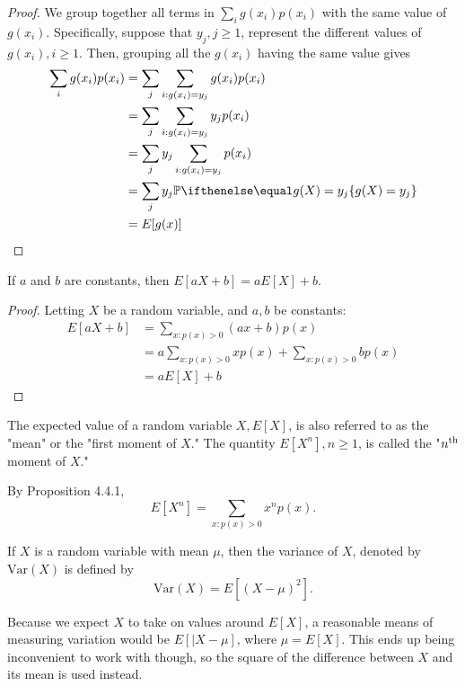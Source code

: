 \documentclass[a4paper,11pt]{article}
\begin{document}
\begin{outline}
    \begin{proof}
      We group together all terms in \(\sum_i g(x_i)p(x_i)\) with the same value of \(g(x_i)\). Specifically, 
      suppose that \(y_j, j\geq 1\), represent the different values of \(g(x_i), i\geq 1\). Then, grouping 
      all the \(g(x_i)\) having the same value gives
      \begin{align*}
        \sum_ig(x_i)p(x_i) &= \sum_j\sum_{i: g(x_i)=y_j} g(x_i)p(x_i) \\
                           &= \sum_j\sum_{i:g(x_i)=y_j} y_jp(x_i) \\
                           &= \sum_jy_j\sum_{i:g(x_i)=y_j}p(x_i) \\
                           &= \sum_jy_j\bbp[g(X)=y_j]\\
                           &= E[g(x)]
      \end{align*}
    \end{proof}
    
    If \(a\) and \(b\) are constants, then \(E[aX + b] = aE[X] + b\).
    
    \begin{proof}
      Letting \(X\) be a random variable, and \(a, b\) be constants:
      \begin{align*}
        E[aX + b] &= \sum_{x:p(x)>0}(ax + b)p(x) \\
                  &= a\sum_{x:p(x)>0}xp(x) + \sum_{x:p(x)>0}bp(x) \\
                  &= aE[X] + b
      \end{align*}
    \end{proof}
    
    The expected value of a random variable \(X, E[X]\), is also referred to as the "mean" or the "first moment 
    of \(X\)." The quantity \(E[X^n], n\geq 1\), is called the "\(n\textsuperscript{th}\) moment of \(X\)."
    
    By Proposition 4.4.1, \[E[X^n] = \sum_{x:p(x)>0}x^np(x)\text{.}\]
    
    If \(X\) is a random variable with mean \(\mu\), then the variance of \(X\), denoted by \(\text{Var}(X)\) 
    is defined by \[\text{Var}(X) = E[(X-\mu)^2]\text{.} \]
    
    \begin{justification}
      Because we expect \(X\) to take on values around \(E[X]\), a reasonable means of measuring variation would be 
      \(E[|X-\mu]\), where \(\mu = E[X]\). This ends up being inconvenient to work with though, so the square of the
      difference between \(X\) and its mean is used instead.
    \end{justification}
    

\end{outline}
\end{document}
